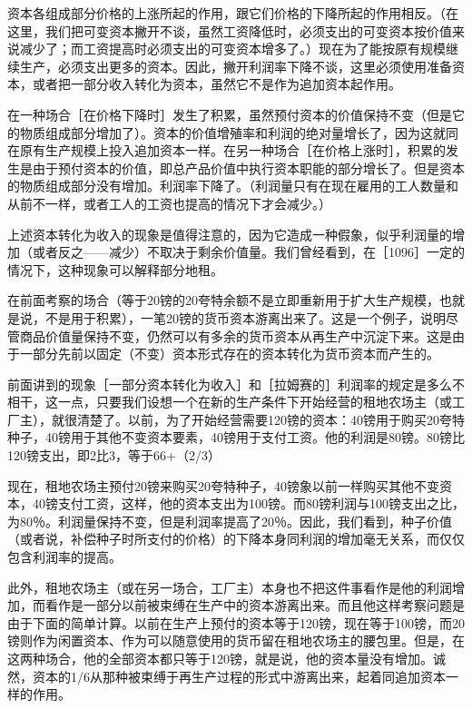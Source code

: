 资本各组成部分价格的上涨所起的作用，跟它们价格的下降所起的作用相反。（在这里，我们把可变资本撇开不谈，虽然工资降低时，必须支出的可变资本按价值来说减少了；而工资提高时必须支出的可变资本增多了。）现在为了能按原有规模继续生产，必须支出更多的资本。因此，撇开利润率下降不谈，这里必须使用准备资本，或者把一部分收入转化为资本，虽然它不是作为追加资本起作用。

在一种场合［在价格下降时］发生了积累，虽然预付资本的价值保持不变（但是它的物质组成部分增加了）。资本的价值增殖率和利润的绝对量增长了，因为这就同在原有生产规模上投入追加资本一样。在另一种场合［在价格上涨时］，积累的发生是由于预付资本的价值，即总产品价值中执行资本职能的部分增长了。但是资本的物质组成部分没有增加。利润率下降了。（利润量只有在现在雇用的工人数量和从前不一样，或者工人的工资也提高的情况下才会减少。）

上述资本转化为收入的现象是值得注意的，因为它造成一种假象，似乎利润量的增加（或者反之——减少）不取决于剩余价值量。我们曾经看到，在［1096］一定的情况下，这种现象可以解释部分地租。

在前面考察的场合（等于20镑的20夸特余额不是立即重新用于扩大生产规模，也就是说，不是用于积累），一笔20镑的货币资本游离出来了。这是一个例子，说明尽管商品价值量保持不变，仍然可以有多余的货币资本从再生产中沉淀下来。这是由于一部分先前以固定（不变）资本形式存在的资本转化为货币资本而产生的。

前面讲到的现象［一部分资本转化为收入］和［拉姆赛的］利润率的规定是多么不相干，这一点，只要我们设想一个在新的生产条件下开始经营的租地农场主（或工厂主），就很清楚了。以前，为了开始经营需要120镑的资本：40镑用于购买20夸特种子，40镑用于其他不变资本要素，40镑用于支付工资。他的利润是80镑。80镑比120镑支出，即2比3，等于66+（2/3）%

现在，租地农场主预付20镑来购买20夸特种子，40镑象以前一样购买其他不变资本，40镑支付工资，这样，他的资本支出为100镑。而80镑利润与100镑支出之比，为80％。利润量保持不变，但是利润率提高了20％。因此，我们看到，种子价值（或者说，补偿种子时所支付的价格）的下降本身同利润的增加毫无关系，而仅仅包含利润率的提高。

此外，租地农场主（或在另一场合，工厂主）本身也不把这件事看作是他的利润增加，而看作是一部分以前被束缚在生产中的资本游离出来。而且他这样考察问题是由于下面的简单计算。以前在生产上预付的资本等于120镑，现在等于100镑，而20镑则作为闲置资本、作为可以随意使用的货币留在租地农场主的腰包里。但是，在这两种场合，他的全部资本都只等于120镑，就是说，他的资本量没有增加。诚然，资本的1/6从那种被束缚于再生产过程的形式中游离出来，起着同追加资本一样的作用。

